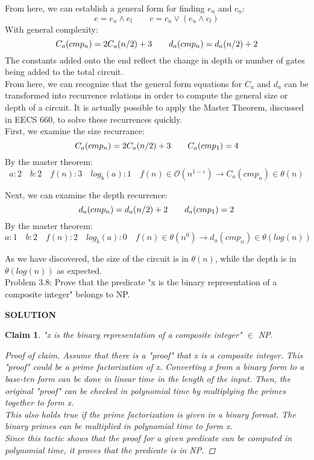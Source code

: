 \documentclass{exam} %
\newcommand{\cl}[1]{\mathcal{#1}}  %
\theoremstyle{plain}
\newtheorem{claim}[thm]{Claim}      \newtheorem*{claim*}{Claim}
\theoremstyle{definition}
\theoremstyle{remark}
\newenvironment{claimproof} {
  \begin{proof}[Proof of claim]
  \renewcommand{\qedsymbol}{\ensuremath{\bullet}}
  } {
  \end{proof}
  }
\numberwithin{equation}{section}  %
\renewcommand{\epsilon}{\varepsilon}
\newcommand{\sol}{\begin{center}\textbf{SOLUTION}\end{center}}
\begin{document}
\begin{questions}
  From here, we can establish a general form for finding $e_n$ and $c_n$: 
  \[
    e = e_u \land e_l \qquad
    c = c_u \lor (e_u \land c_l)
  \]
  With general complexity:\\
  \[
    C_a(cmp_n) = 2C_a(n/2) + 3 \qquad
    d_a(cmp_n) = d_a(n/2) + 2\\
  \]
  The constants added onto the end reflect the change in depth or number of gates 
  being added to the total circuit.\\

  From here, we can recognize that the general form equations for $C_a$ and $d_a$ can
  be transformed into recurrence relations in order to compute the general size or 
  depth of a circuit. It is actually possible to apply the Master Theorem, discussed
  in EECS 660, to solve these recurrences quickly.\\

  First, we examine the size recurrance:\\
  \[
    C_a(cmp_n) = 2C_a(n/2) + 3\qquad
    C_a(cmp_1) = 4\\
  \]
  By the master theorem:\\
  \[
    a: 2\quad
    b: 2\quad
    f(n): 3\quad
    log_b(a): 1\quad
    f(n) \in \cl{O}(n^{1-\epsilon}) \rightarrow C_a(cmp_n) \in \theta(n)
  \]

  Next, we can examine the depth recurrence:\\
  \[
    d_a(cmp_n) = d_a(n/2) + 2\qquad
    d_a(cmp_1) = 2\\
  \]
  By the master theorem:\\
  \[
    a: 1\quad
    b: 2\quad
    f(n): 2\quad
    log_b(a): 0\quad
    f(n) \in \theta(n^{0}) \rightarrow d_a(cmp_n) \in \theta(log(n))
  \]

  As we have discovered, the size of the circuit is in $\theta(n)$, while the depth
  is in $\theta(log(n))$ as expected.\\
  \question Problem 3.8: Prove that the predicate "x is the binary representation of
  a composite integer" belongs to NP.\\
  \sol
  \begin{claim} "x is the binary representation of a composite integer" $\in$ NP.
    \begin{claimproof}
      Assume that there is a "proof" that x is a composite integer. This "proof" 
      could be a prime factorization of x. Converting x from a binary form to a 
      base-ten form can be done in linear time in the length of the input. Then, 
      the original "proof" can be checked in polynomial time by multiplying the 
      primes together to form x.\\

      This also holds true if the prime factorization is given in a binary format.
      The binary primes can be multiplied in polynomial time to form x.\\

      Since this tactic shows that the proof for a given predicate can be computed
      in polynomial time, it proves that the predicate is in NP.
    \end{claimproof}
  \end{claim}
\end{questions}
\end{document}
